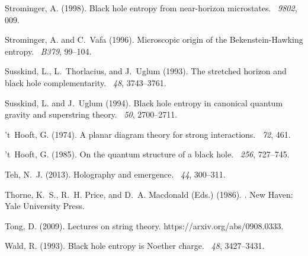 \documentclass[12pt]{article}
\begin{document}
\begin{thebibliography}{}
Strominger, A. (1998).
\newblock Black hole entropy from near-horizon microstates.
~{\em 9802}, 009.

Strominger, A. and C.~Vafa (1996).
\newblock Microscopic origin of the {B}ekenstein-{H}awking entropy.
~{\em B379}, 99--104.

Susskind, L., L.~Thorlacius, and J.~Uglum (1993).
\newblock The stretched horizon and black hole complementarity.
~{\em 48}, 3743--3761.

Susskind, L. and J.~Uglum (1994).
\newblock Black hole entropy in canonical quantum gravity and superstring
  theory.
~{\em 50}, 2700--2711.

't~Hooft, G. (1974).
\newblock A planar diagram theory for strong interactions.
~{\em 72}, 461.

't~Hooft, G. (1985).
\newblock On the quantum structure of a black hole.
~{\em 256}, 727--745.

Teh, N.~J. (2013).
\newblock Holography and emergence.
~{\em 44},
  300--311.

Thorne, K.~S., R.~H. Price, and D.~A. Macdonald (Eds.) (1986).
.
\newblock New Haven: Yale University Press.

Tong, D. (2009).
\newblock Lectures on string theory.
\newblock https://arxiv.org/abs/0908.0333.

Wald, R. (1993).
\newblock Black hole entropy is {N}oether charge.
~{\em 48}, 3427--3431.


\end{thebibliography}
\end{document}
